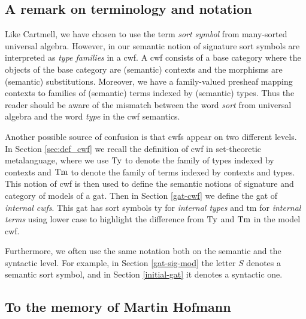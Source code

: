 \documentclass{lmcs}
\newcommand{\ty}{\mathrm{ty}}
\newcommand{\tm}{\mathrm{tm}}
\begin{document}

\subsection*{A remark on terminology and notation}
Like Cartmell, we have chosen to use the term {\em sort symbol} from many-sorted universal algebra. However, in our semantic notion of signature sort symbols are interpreted as {\em type families} in a cwf. A cwf consists of a base category where the objects of the base category are (semantic) contexts and the morphisms are (semantic) substitutions. Moreover, we have a family-valued presheaf mapping contexts to families of (semantic) terms indexed by (semantic) types. Thus the reader should be aware of the mismatch between the word {\em sort} from universal algebra and the word {\em type} in the cwf semantics.

Another possible source of confusion is that cwfs appear on two different levels. In Section \ref{sec:def_cwf} we recall the definition of cwf in set-theoretic metalanguage, where we use $\mathrm{Ty}$ to denote the family of types indexed by contexts and $\mathrm{Tm}$ to denote the family of terms indexed by contexts and types. This notion of cwf is then used to define the semantic notions of signature and category of models of a gat. Then in Section \ref{gat-cwf} we define the gat of {\em internal cwfs}. This gat has sort symbols $\ty$ for {\em internal types} and $\tm$ for {\em internal terms} using lower case to highlight the difference from $\mathrm{Ty}$ and $\mathrm{Tm}$ in the model cwf. 

Furthermore, we often use the same notation both on the semantic and the syntactic level. For example, in Section \ref{gat-sig-mod} the letter $S$ denotes a semantic sort symbol, and in Section \ref{initial-gat} it denotes a syntactic one.

\subsection*{To the memory of Martin Hofmann}
\end{document}
